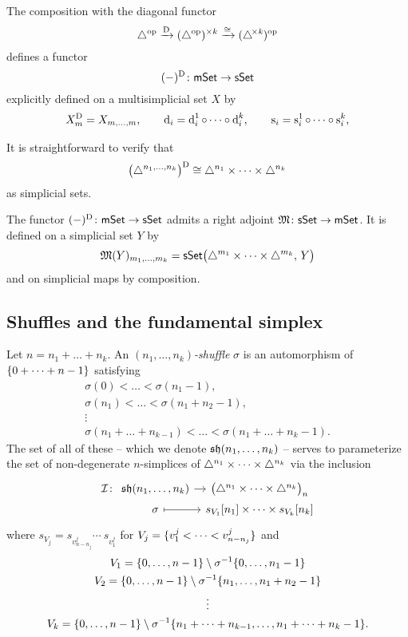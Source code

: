 The composition with the diagonal functor
\[
\triangle^{\mathrm{op}} \xrightarrow{\mathrm{D}}
(\triangle^{\mathrm{op}})^{\times k} \xrightarrow{\cong}
(\triangle^{\!\times\mathit{k}})^{\mathrm{op}}
\]
defines a functor
\[
(-)^{\mathrm{D}} \colon \mathsf{mSet} \to \mathsf{sSet}
\]
explicitly defined on a multisimplicial set $X$ by
\begin{gather*}
X^{\mathrm{D}}_m = X_{m, \dots, m},
\qquad
\operatorname{d}_i = \operatorname{d}_i^1 \circ \dots \circ \operatorname{d}_i^k,
\qquad
\operatorname{s}_i = \operatorname{s}_i^1 \circ \dots \circ \operatorname{s}_i^k,
\end{gather*}

It is straightforward to verify that
\[
\big( \triangle^{n_1, \dots, n_k} \big)^{\mathrm{D}} \cong
\triangle^{n_1} \times \dots \times \triangle^{n_k}
\]
as simplicial sets.

The functor $(-)^{\mathrm{D}} \colon \mathsf{mSet} \to \mathsf{sSet}$ admits a right adjoint $\operatorname{\mathfrak{M}} \colon \mathsf{sSet} \to \mathsf{mSet}$.
It is defined on a simplicial set $Y$ by
\[
\operatorname{\mathfrak{M}}(Y)_{m_1, \dots, m_k} =
\mathsf{sSet}\big( \triangle^{m_1} \times \dots \times \triangle^{m_k}, \, Y \big)
\]
and on simplicial maps by composition.

\subsection{Shuffles and the fundamental simplex} \label{ss:shuffles and fundamental simplex}

Let $n = n_1 + \dots + n_k$.
An \textit{$(n_1, \dots, n_k)$-shuffle} $\sigma$ is an automorphism of $\{0 + \dots + n-1\}$ satisfying
\begin{gather*}
	\sigma(0) < \dots < \sigma(n_1-1), \\
	\sigma(n_1) < \dots < \sigma(n_1+n_2-1), \\
	\vdots \\
	\sigma(n_1+\dots+n_{k-1}) < \dots < \sigma(n_1+\dots+n_k-1).
\end{gather*}
The set of all of these -- which we denote $\operatorname{\mathfrak{sh}}(n_1, \dots, n_k)$ -- serves to parameterize the set of non-degenerate $n$-simplices of $\triangle^{n_1} \times \dots \times \triangle^{n_k}$ via the inclusion
\[
\begin{tikzcd}[column sep=tiny, row sep=0]
	\cI \colon &[-10pt]
	\sh(n_1, \dots, n_k) \arrow[r] &
	\big(\simplex^{n_1} \times \dots \times \simplex^{n_k}\big)_n \\ &
	\sigma \arrow[r, mapsto] &
	s_{V_1} [n_1] \times \dots \times s_{V_k} [n_k]
\end{tikzcd}
\]
where $s_{V_j} = s_{v_{n-n_j}^j} \dotsb \ s_{v_1^j}$ for $V_j = \{v_1^j < \dots < v_{n-n_j}^j\}$ and
\begin{gather*}
	V_1 = \{0,\dots,n-1\} \setminus \sigma^{-1} \{0,\dots,n_1-1\} \\
	V_2 = \{0,\dots,n-1\} \setminus \sigma^{-1} \{n_1, \dots, n_1+n_2-1\} \\
	\vdots \\
	V_k = \{0,\dots,n-1\} \setminus \sigma^{-1} \{n_1+\dots+n_{k-1}, \dots, n_1+\dots+n_k-1\}.
\end{gather*}

